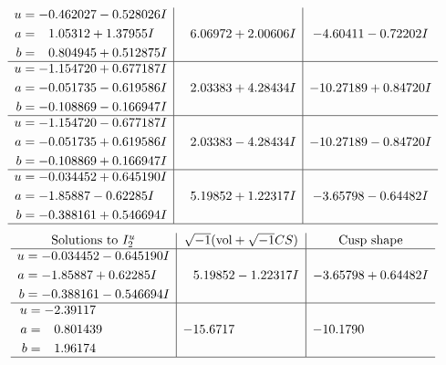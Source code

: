 \documentclass[1p]{elsarticle_modified}
\theoremstyle{definition}
\newcommand{\I}{\sqrt{-1}}
\begin{document}
$$\begin{array}{c|c|c}
\begin{aligned}
u &= -0.462027 - 0.528026 I \\
a &= \phantom{-}1.05312 + 1.37955 I \\
b &= \phantom{-}0.804945 + 0.512875 I\end{aligned}
 & \phantom{-}6.06972 + 2.00606 I & -4.60411 - 0.72202 I \\ \hline\begin{aligned}
u &= -1.154720 + 0.677187 I \\
a &= -0.051735 - 0.619586 I \\
b &= -0.108869 - 0.166947 I\end{aligned}
 & \phantom{-}2.03383 + 4.28434 I & -10.27189 + 0.84720 I \\ \hline\begin{aligned}
u &= -1.154720 - 0.677187 I \\
a &= -0.051735 + 0.619586 I \\
b &= -0.108869 + 0.166947 I\end{aligned}
 & \phantom{-}2.03383 - 4.28434 I & -10.27189 - 0.84720 I \\ \hline\begin{aligned}
u &= -0.034452 + 0.645190 I \\
a &= -1.85887 - 0.62285 I \\
b &= -0.388161 + 0.546694 I\end{aligned}
 & \phantom{-}5.19852 + 1.22317 I & -3.65798 - 0.64482 I\\
 \hline 
 \end{array}$$\newpage$$\begin{array}{c|c|c}  
\text{Solutions to }I^u_{2}& \I (\text{vol} + \sqrt{-1}CS) & \text{Cusp shape}\\
 \hline 
\begin{aligned}
u &= -0.034452 - 0.645190 I \\
a &= -1.85887 + 0.62285 I \\
b &= -0.388161 - 0.546694 I\end{aligned}
 & \phantom{-}5.19852 - 1.22317 I & -3.65798 + 0.64482 I \\ \hline\begin{aligned}
u &= -2.39117\phantom{ +0.000000I} \\
a &= \phantom{-}0.801439\phantom{ +0.000000I} \\
b &= \phantom{-}1.96174\phantom{ +0.000000I}\end{aligned}
 & -15.6717\phantom{ +0.000000I} & -10.1790\phantom{ +0.000000I}\\
 \hline 
 \end{array}$$\newpage\newpage\renewcommand{\arraystretch}{1}
\end{document}
